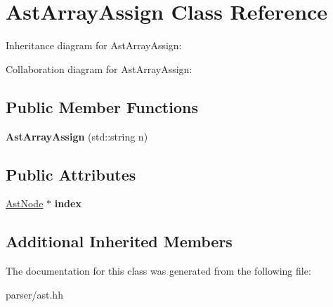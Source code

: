 \hypertarget{classAstArrayAssign}{}\section{Ast\+Array\+Assign Class Reference}
\label{classAstArrayAssign}


Inheritance diagram for Ast\+Array\+Assign\+:


Collaboration diagram for Ast\+Array\+Assign\+:
\subsection*{Public Member Functions}
\begin{DoxyCompactItemize}
\item 
\mbox{\label{classAstArrayAssign_a693958ec986b8bfbef27950c16c27e0d}} 
{\bfseries Ast\+Array\+Assign} (std\+::string n)
\end{DoxyCompactItemize}
\subsection*{Public Attributes}
\begin{DoxyCompactItemize}
\item 
\mbox{\label{classAstArrayAssign_ac024d67438be52df431c98e1542c4c08}} 
\hyperlink{classAstNode}{Ast\+Node} $\ast$ {\bfseries index}
\end{DoxyCompactItemize}
\subsection*{Additional Inherited Members}


The documentation for this class was generated from the following file\+:\begin{DoxyCompactItemize}
\item 
parser/ast.\+hh\end{DoxyCompactItemize}
